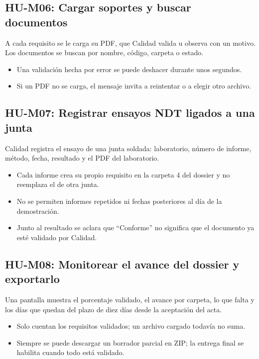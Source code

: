 \documentclass[11pt]{article}
\begin{document}
\subsection*{HU-M06: Cargar soportes y buscar documentos}
A cada requisito se le carga su PDF, que Calidad valida u observa con un motivo. Los documentos se buscan por nombre, código, carpeta o estado.
\begin{itemize}
  \item Una validación hecha por error se puede deshacer durante unos segundos.
  \item Si un PDF no se carga, el mensaje invita a reintentar o a elegir otro archivo.
\end{itemize}

\subsection*{HU-M07: Registrar ensayos NDT ligados a una junta}
Calidad registra el ensayo de una junta soldada: laboratorio, número de informe, método, fecha, resultado y el PDF del laboratorio.
\begin{itemize}
  \item Cada informe crea su propio requisito en la carpeta 4 del dossier y no reemplaza el de otra junta.
  \item No se permiten informes repetidos ni fechas posteriores al día de la demostración.
  \item Junto al resultado se aclara que ``Conforme'' no significa que el documento ya esté validado por Calidad.
\end{itemize}

\subsection*{HU-M08: Monitorear el avance del dossier y exportarlo}
Una pantalla muestra el porcentaje validado, el avance por carpeta, lo que falta y los días que quedan del plazo de diez días desde la aceptación del acta.
\begin{itemize}
  \item Solo cuentan los requisitos validados; un archivo cargado todavía no suma.
  \item Siempre se puede descargar un borrador parcial en ZIP; la entrega final se habilita cuando todo está validado.
\end{itemize}
\end{document}
